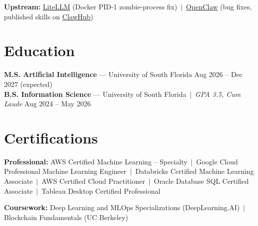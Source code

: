 \documentclass[10pt,letterpaper]{article}
\begin{document}
\vspace{1pt}

\textbf{Upstream:} \href{https://github.com/BerriAI/litellm}{LiteLLM} (Docker PID-1 zombie-process fix) \,$\vert$\, \href{https://github.com/openclaw/openclaw}{OpenClaw} (bug fixes, published skills on \href{https://clawhub.ai}{ClawHub})

\section{Education}

\textbf{M.S. Artificial Intelligence} --- University of South Florida \hfill Aug 2026 -- Dec 2027 (expected) \\[2pt]
\textbf{B.S. Information Science} --- University of South Florida \,$\vert$\, \textit{GPA 3.5, Cum Laude} \hfill Aug 2024 -- May 2026

\section{Certifications}
\textbf{Professional:} AWS Certified Machine Learning -- Specialty \,$\vert$\, Google Cloud Professional Machine Learning Engineer \,$\vert$\, Databricks Certified Machine Learning Associate \,$\vert$\, AWS Certified Cloud Practitioner \,$\vert$\, Oracle Database SQL Certified Associate \,$\vert$\, Tableau Desktop Certified Professional

\vspace{1pt}

\textbf{Coursework:} Deep Learning and MLOps Specializations (DeepLearning.AI) \,$\vert$\, Blockchain Fundamentals (UC Berkeley)
\end{document}
